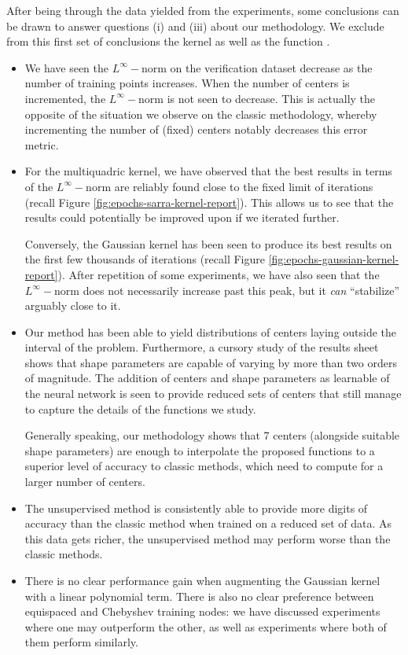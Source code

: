 \documentclass[12pt]{report} %
\newcommand{\tmem}[1]{{\em #1\/}}
\newcommand{\tmverbatim}[1]{\text{{\ttfamily{#1}}}}
\begin{document}
After being through the data yielded from the experiments, some conclusions can
be drawn to answer questions (i) and (iii) about our methodology. We exclude
from this first set of conclusions the kernel \tmverbatim{phs\_kernel} as well
as the function \tmverbatim{torch\_sign}.
\begin{itemize}
  \item We have seen the $L^{\infty} -$norm on the verification dataset
        decrease as the number of training points increases. When the number of
        centers is incremented, the $L^{\infty} -$norm is not seen to decrease. This
        is actually the opposite of the situation we observe on the classic
        methodology, whereby incrementing the number of (fixed) centers notably
        decreases this error metric.

  \item For the multiquadric kernel, we have observed that the best results
        in terms of the $L^{\infty} -$norm are reliably found close to the fixed
        limit of iterations (recall Figure \ref{fig:epochs-sarra-kernel-report}).
        This allows us to see that the results could potentially be improved upon if
        we iterated further.

        Conversely, the Gaussian kernel has been seen to produce its best results
        on the first few thousands of iterations (recall Figure
        \ref{fig:epochs-gaussian-kernel-report}). After repetition of some
        experiments, we have also seen that the $L^{\infty} -$norm does not
        necessarily increase past this peak, but it {\tmem{can}} ``stabilize''
        arguably close to it.

  \item Our method has been able to yield distributions of centers laying
        outside the interval of the problem. Furthermore, a cursory study of the results sheet shows that shape parameters are capable of varying by
        more than two orders of magnitude. The addition of centers and shape parameters as learnable of the neural network is seen to provide reduced sets of centers
        that still manage to capture the details of the functions we study.

        Generally speaking, our methodology shows that 7 centers (alongside
        suitable shape parameters) are enough to interpolate the proposed functions
        to a superior level of accuracy to classic methods, which need to compute for a larger number
        of centers.

  \item The unsupervised method is consistently able to provide more digits of
        accuracy than the classic method when trained on a reduced set of data.
        As this data gets richer, the unsupervised method may perform worse than 
        the classic methods.

  \item There is no clear performance gain when augmenting the Gaussian kernel with a linear polynomial term. There is also no clear preference between equispaced and Chebyshev training nodes: we have discussed experiments where one may outperform the other, as well as experiments where both of them perform similarly.
\end{itemize}
\end{document}

